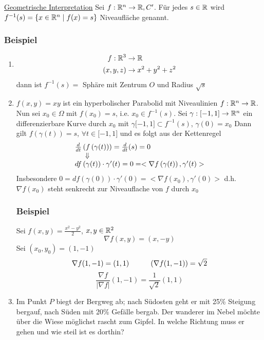 \noindent \underline{Geometrische Interpretation}
Sei $f:\mathbb{R}^n\to\mathbb{R}, C'$. Für jedes $s\in\mathbb{R}$ wird $f^{-1}(s)=\left\{ x\in\mathbb{R}^n\mid f(x)=s\right\}$ Niveaufläche genannt.

\subsubsection*{Beispiel}
\begin{enumerate}
    \item \begin{align*}
 f:\mathbb{R}^3 &\to\mathbb{R}\\
 \left( x,y,z\right) &\to x^2 +y^2 +z^2
 \end{align*}
dann ist $f^{-1}(s)=$ Sphäre mit Zentrum $O$ und Radius $\sqrt{s}$
\item $f\left( x,y\right) = xy$ ist ein hyperbolischer Parabolid mit Niveaulinien  $f:\mathbb{R}^n \to\mathbb{R}$. Nun sei $x_0\in\Omega$ mit $f\left( x_0\right) = s$, i.e. $x_0 \in f^{-1} (s)$. Sei $\gamma :\lbrack -1,1\rbrack\to \mathbb{R}^n$ ein differenzierbare Kurve durch $x_0$ mit $\gamma\lbrack -1,1\rbrack\subset f^{-1}(s)$, $\gamma (0)=x_0$
Dann gilt $f\left( \gamma (t)\right)=s$, $\forall t\in\lbrack -1,1\rbrack$ und es folgt aus der Kettenregel
\[\begin{array}{l}%
\frac{d}{{dt}}\left( {f\left( {\gamma (t)} \right)} \right) = \frac{d}{{dt}}(s) = 0\\
\hspace{5mm} \Downarrow \\
df\left( {\gamma (t)} \right) \cdot \gamma '(t) = 0 =  < \nabla f\left( {\gamma (t)} \right),\gamma '(t) >
\end{array}\]
Insbesondere $0=df\left(\gamma (0)\right)\cdot\gamma'(0)= < \nabla f\left( x_0\right),\gamma'(0) >$ d.h. $\nabla f\left( x_0\right)$ steht senkrecht zur Niveauflache von $f$ durch $x_0$
\subsubsection*{Beispiel}
Sei $f(x,y)=\frac{x^2-y^2}{2}$, $x,y\in\mathbb{R}^2$ \[\nabla f(x,y)=(x,-y)\] Sei $\left( x_0,y_0\right) = (1,-1)$ \[\nabla f(1,-1)=(1,1)\hspace{10mm} \left( \nabla f(1,-1)\right) = \sqrt{2}\] \[\frac{\nabla f}{\left| \nabla f\right|}(1,-1)=\frac{1}{\sqrt{2}}(1,1)\]
\item Im Punkt $P$ biegt der Bergweg ab; nach Südosten geht er mit 25\% Steigung bergauf, nach Süden mit 20\% Gefälle bergab. Der wanderer im Nebel möchte über die Wiese möglichst rascht zum Gipfel. In welche Richtung muss er gehen und wie steil ist es dorthin?\\


\end{enumerate}

